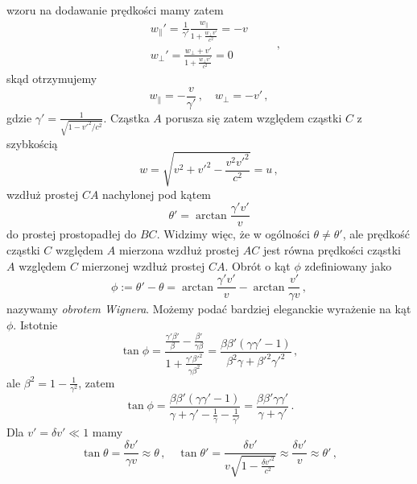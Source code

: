 \documentclass[../main.tex]{subfiles}
\begin{document}
wzoru na dodawanie prędkości mamy zatem
\begin{equation*}
    \begin{split}
        &w_\parallel '=\frac{1}{\gamma'}\frac{w_\parallel}{1+\frac{w_\perp v'}{c^2}}=-v\\
        &w_\perp'=\frac{w_\perp+v'}{1+\frac{w_\perp v'}{c^2}}=0
    \end{split}\quad\quad\,,
\end{equation*}
skąd otrzymujemy
\begin{equation*}
    w_\parallel=-\frac{v}{\gamma'}\,,\quad w_\perp=-v'\,,
\end{equation*}
gdzie \(\gamma'=\frac{1}{\sqrt{1-v'^2/c^2}}\). Cząstka \(A\) porusza się zatem względem cząstki
\(C\) z szybkością
\begin{equation*}
    w=\sqrt{v^2+v'^2-\frac{v^2v'^2}{c^2}}=u\,,
\end{equation*}
wzdłuż prostej \(CA\) nachylonej pod kątem
\begin{equation*}
    \theta'=\arctan\frac{\gamma'v'}{v}
\end{equation*}
do prostej prostopadłej do \(BC\). Widzimy więc, że w ogólności \(\theta\neq\theta'\), ale prędkość
cząstki \(C\) względem \(A\) mierzona wzdłuż prostej \(AC\) jest równa prędkości cząstki \(A\)
względem \(C\) mierzonej wzdłuż prostej \(CA\). Obrót  o kąt \(\phi\) zdefiniowany jako
\begin{equation*}
    \phi:=\theta'-\theta=\arctan\frac{\gamma'v'}{v}-\arctan\frac{v'}{\gamma v}\,,
\end{equation*}
nazywamy \textit{obrotem Wignera}. Możemy podać bardziej eleganckie wyrażenie na kąt \(\phi\).
Istotnie
\begin{equation*}
    \tan\phi=\frac{\frac{\gamma'\beta'}{\beta}-\frac{\beta'}{\gamma\beta}}{1+\frac{\gamma'\beta'^2}{\gamma\beta^2}}=\frac{\beta\beta'(\gamma\gamma'-1)}{\beta^2\gamma+\beta'^2\gamma'^2}\,,
\end{equation*}
ale \(\beta^2=1-\frac{1}{\gamma^2}\), zatem
\begin{equation*}
    \tan\phi=\frac{\beta\beta'(\gamma\gamma'-1)}{\gamma+\gamma'-\frac{1}{\gamma}-\frac{1}{\gamma'}}=\frac{\beta\beta'\gamma\gamma'}{\gamma+\gamma'}\,.
\end{equation*}
Dla \(v'=\delta v'\ll 1\) mamy
\begin{equation*}
    \tan\theta=\frac{\delta v'}{\gamma v}\approx\theta\,,\quad \tan\theta'=\frac{\delta v'}{v\sqrt{1-\frac{\delta v'^2}{c^2}}}\approx \frac{\delta v'}{v}\approx \theta'\,,
\end{equation*}
\end{document}
